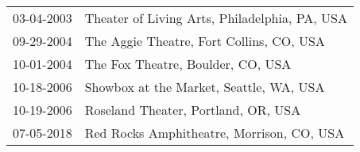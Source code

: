 \begin{supertabular}{ll}
 03-04-2003 &  Theater of Living Arts, Philadelphia, PA, USA \\
 09-29-2004 &       The Aggie Theatre, Fort Collins, CO, USA \\
 10-01-2004 &              The Fox Theatre, Boulder, CO, USA \\
 10-18-2006 &        Showbox at the Market, Seattle, WA, USA \\
 10-19-2006 &            Roseland Theater, Portland, OR, USA \\
 07-05-2018 &      Red Rocks Amphitheatre, Morrison, CO, USA \\
\end{supertabular}
